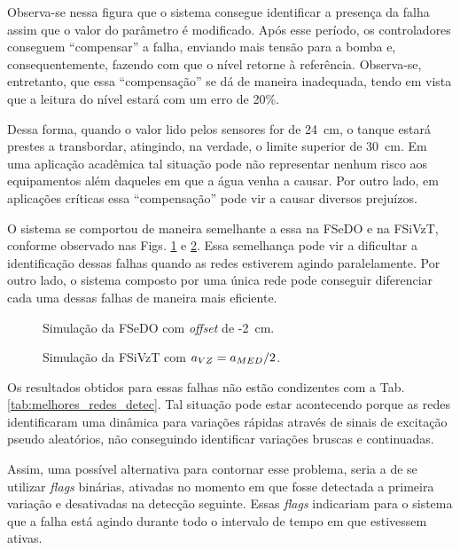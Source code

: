 Observa-se nessa figura que o sistema consegue identificar a presença da falha
assim que o valor do parâmetro é modificado. Após esse período, os controladores
conseguem ``compensar'' a falha, enviando mais tensão para a bomba e,
consequentemente, fazendo com que o nível retorne à referência. Observa-se,
entretanto, que essa ``compensação'' se dá de maneira inadequada, tendo em vista
que a leitura do nível estará com um erro de 20\%. 

Dessa forma, quando o valor lido pelos sensores for de 24\ cm, o tanque estará
prestes a transbordar, atingindo, na verdade, o limite superior de 30\ cm. Em
uma aplicação acadêmica tal situação pode não representar nenhum risco aos
equipamentos além daqueles em que a água venha a causar. Por outro lado, em
aplicações críticas essa ``compensação'' pode vir a causar diversos prejuízos.

O sistema se comportou de maneira semelhante a essa na FSeDO e na FSiVzT,
conforme observado nas Figs. \ref{fig:fsedo} e \ref{fig:fsivzt}. Essa semelhança
pode vir a dificultar a identificação dessas falhas quando as redes estiverem
agindo paralelamente. Por outro lado, o sistema composto por uma única rede pode
conseguir diferenciar cada uma dessas falhas de maneira mais eficiente. 

\begin{figure}[htb]
\footnotesize
\centering

\vspace{1cm}
\caption{Simulação da FSeDO com {\it offset} de -2\ cm.}
\label{fig:fsedo}
\end{figure}

\begin{figure}[htb]
\footnotesize
\centering

\vspace{1cm}
\caption{Simulação da FSiVzT com $a_{\tiny VZ} = a_{\tiny MED}/2$.}
\label{fig:fsivzt}
\end{figure}

Os resultados obtidos para essas falhas não estão condizentes com a Tab.
\ref{tab:melhores_redes_detec}. Tal situação pode estar acontecendo porque as
redes identificaram uma dinâmica para variações rápidas através de sinais de
excitação pseudo aleatórios, não conseguindo identificar variações bruscas e
continuadas.

Assim, uma possível alternativa para contornar esse problema, seria a de se
utilizar {\it flags} binárias, ativadas no momento em que fosse detectada a
primeira variação e desativadas na detecção seguinte. Essas {\it flags}
indicariam para o sistema que a falha está agindo durante todo o intervalo de
tempo em que estivessem ativas.


